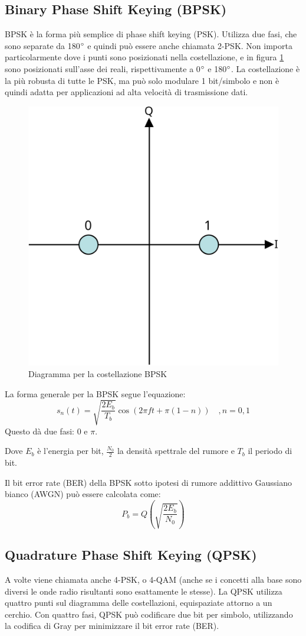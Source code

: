 \subsection{Binary Phase Shift Keying (BPSK)}
\ac{BPSK} è la forma più semplice di phase shift keying (\ac{PSK}).
Utilizza due fasi, che sono separate da 180$\degree$ e quindi può essere anche chiamata 2-\ac{PSK}.
Non importa particolarmente dove i punti sono posizionati nella costellazione, e in figura \ref{fig:bpsk-diagram} sono posizionati sull'asse dei reali, rispettivamente a 0$\degree$ e 180$\degree$.
La costellazione è la più robusta di tutte le \ac{PSK}, ma può solo modulare 1 bit/simbolo e non è quindi adatta per applicazioni ad alta velocità di trasmissione dati.

\begin{figure}[htbp]
  \centering
  \includegraphics[width=0.4\linewidth]{./res/img/bpsk_diagram.png}
  \caption{Diagramma per la costellazione BPSK}
  \label{fig:bpsk-diagram}
\end{figure}

La forma generale per la \ac{BPSK} segue l'equazione:
$$s_n(t) = \sqrt{\frac{2E_b}{T_b}} \cos(2\pi f t + \pi(1-n)) \quad , n = 0,1 $$
Questo dà due fasi: 0 e $\pi$.

Dove $E_b$ è l'energia per bit, $\frac{N_0}{2}$ la densità spettrale del rumore e $T_b$ il periodo di bit.

Il bit error rate (\ac{BER}) della \ac{BPSK} sotto ipotesi di rumore addittivo Gaussiano bianco (\acs{AWGN}) può essere calcolata come:
$$P_b = Q(\sqrt{\frac{2 E_b}{N_0}})$$

\subsection{Quadrature Phase Shift Keying (QPSK)}
A volte viene chiamata anche 4-\ac{PSK}, o 4-\ac{QAM} (anche se i concetti alla base sono diversi le onde radio risultanti sono esattamente le stesse).
La \ac{QPSK} utilizza quattro punti sul diagramma delle costellazioni, equispaziate attorno a un cerchio.
Con quattro fasi, \ac{QPSK} può codificare due bit per simbolo, utilizzando la codifica di Gray per minimizzare il bit error rate (\ac{BER}).

